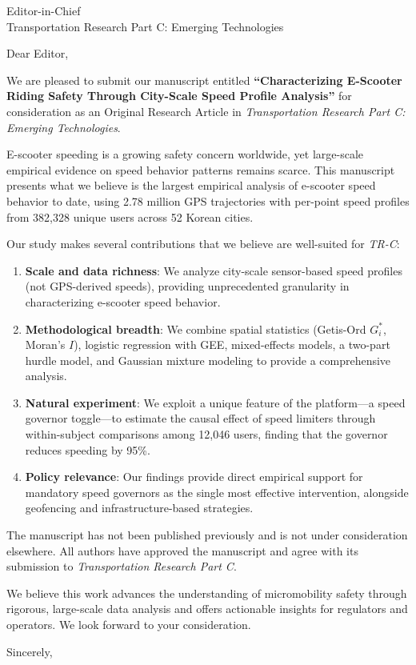 \documentclass[11pt]{letter}
\date{\today}
\begin{document}
\begin{letter}{Editor-in-Chief\\
Transportation Research Part C: Emerging Technologies}

\opening{Dear Editor,}

We are pleased to submit our manuscript entitled \textbf{``Characterizing E-Scooter Riding Safety Through City-Scale Speed Profile Analysis''} for consideration as an Original Research Article in \textit{Transportation Research Part C: Emerging Technologies}.

E-scooter speeding is a growing safety concern worldwide, yet large-scale empirical evidence on speed behavior patterns remains scarce. This manuscript presents what we believe is the largest empirical analysis of e-scooter speed behavior to date, using 2.78 million GPS trajectories with per-point speed profiles from 382,328 unique users across 52 Korean cities.

Our study makes several contributions that we believe are well-suited for \textit{TR-C}:

\begin{enumerate}
    \item \textbf{Scale and data richness}: We analyze city-scale sensor-based speed profiles (not GPS-derived speeds), providing unprecedented granularity in characterizing e-scooter speed behavior.
    \item \textbf{Methodological breadth}: We combine spatial statistics (Getis-Ord $G_i^*$, Moran's $I$), logistic regression with GEE, mixed-effects models, a two-part hurdle model, and Gaussian mixture modeling to provide a comprehensive analysis.
    \item \textbf{Natural experiment}: We exploit a unique feature of the platform---a speed governor toggle---to estimate the causal effect of speed limiters through within-subject comparisons among 12,046 users, finding that the governor reduces speeding by 95\%.
    \item \textbf{Policy relevance}: Our findings provide direct empirical support for mandatory speed governors as the single most effective intervention, alongside geofencing and infrastructure-based strategies.
\end{enumerate}

The manuscript has not been published previously and is not under consideration elsewhere. All authors have approved the manuscript and agree with its submission to \textit{Transportation Research Part C}.

We believe this work advances the understanding of micromobility safety through rigorous, large-scale data analysis and offers actionable insights for regulators and operators. We look forward to your consideration.

\closing{Sincerely,}

\end{letter}
\end{document}
